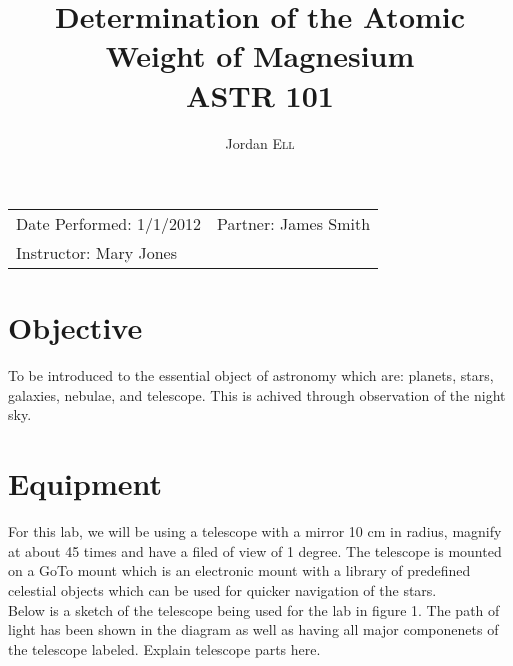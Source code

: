 \documentclass{article}
\title{Determination of the Atomic \\ Weight of Magnesium \\ ASTR 101} %
\author{Jordan \textsc{Ell}} %
\begin{document}
\maketitle %

\begin{tabular}{lr}
Date Performed: 1/1/2012 & Partner: James Smith\\ %
Instructor: Mary Jones %
\end{tabular}

\setlength\parindent{0pt} %

\renewcommand{\labelenumi}{\alph{enumi}.} %


\section{Objective}

To be introduced to the essential object of astronomy which are: planets, stars, galaxies, nebulae, and telescope. This is
achived through observation of the night sky.\\
 

\section{Equipment}

For this lab, we will be using a telescope with a mirror 10 cm in radius, magnify at about 45 times and have a filed of view of 1 degree.
The telescope is mounted on a GoTo mount which is an electronic mount with a library of predefined celestial objects which can be 
used for quicker navigation of the stars.\\

Below is a sketch of the telescope being used for the lab in figure 1. The path of light has been shown in the diagram as well as
having all major componenets of the telescope labeled. Explain telescope parts here.\\
\end{document}
